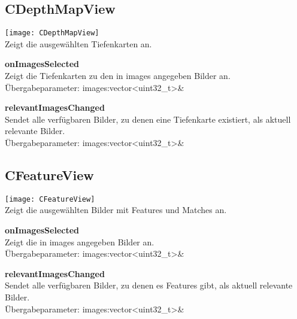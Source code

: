\subsection{CDepthMapView}
\texttt{[image: CDepthMapView]}\\
Zeigt die ausgewählten Tiefenkarten an.
\beginMembers
{}
\closeMembers
\beginSlots
\item \textbf{onImagesSelected} \\Zeigt die Tiefenkarten zu den in images angegeben Bilder an. \\Übergabeparameter: images:vector<uint32\_t>\&
\closeMembers
\beginSignals
\item \textbf{relevantImagesChanged} \\ Sendet alle verfügbaren Bilder, zu denen eine Tiefenkarte existiert, als aktuell relevante Bilder. \\Übergabeparameter: images:vector<uint32\_t>\&
\closeMembers

\subsection{CFeatureView}
\texttt{[image: CFeatureView]}\\
Zeigt die ausgewählten Bilder mit Features und Matches an.
\beginMembers
{}
\closeMembers
\beginSlots
\item \textbf{onImagesSelected} \\Zeigt die in images angegeben Bilder an. \\Übergabeparameter: images:vector<uint32\_t>\&
\closeMembers
\beginSignals
\item \textbf{relevantImagesChanged} \\ Sendet alle verfügbaren Bilder, zu denen es Features gibt, als aktuell relevante Bilder. \\Übergabeparameter: images:vector<uint32\_t>\&
\closeMembers

